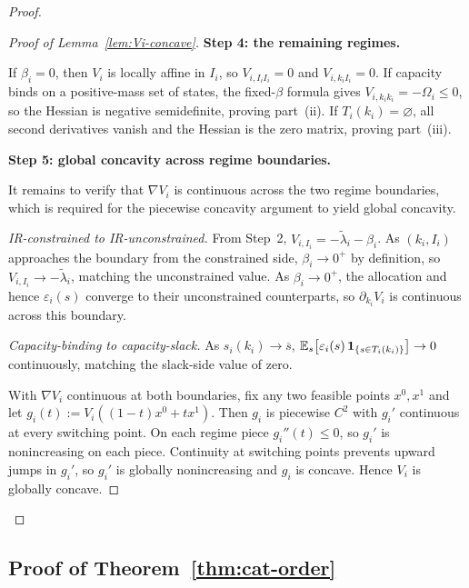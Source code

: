 \documentclass[master.tex]{subfiles}
\begin{document}
\begin{proof}
\begin{proof}[Proof of Lemma~\ref{lem:Vi-concave}]
\noindent\textbf{Step 4: the remaining regimes.}

If $\beta_i=0$, then $V_i$ is locally affine in $I_i$, so $V_{i,I_iI_i}=0$ and $V_{i,k_iI_i}=0$. If capacity binds on a positive-mass set of states, the fixed-$\beta$ formula gives $V_{i,k_ik_i}=-\Omega_i\le 0$, so the Hessian is negative semidefinite, proving part~(ii). If $T_i(k_i)=\varnothing$, all second derivatives vanish and the Hessian is the zero matrix, proving part~(iii).


\noindent\textbf{Step 5: global concavity across regime boundaries.}

It remains to verify that $\nabla V_i$ is continuous across the two regime boundaries, which is required for the piecewise concavity argument to yield global concavity.

\textit{IR-constrained to IR-unconstrained.} From Step~2, $V_{i,I_i}=-\tilde\lambda_i-\beta_i$. As $(k_i,I_i)$ approaches the boundary from the constrained side, $\beta_i\to 0^+$ by definition, so $V_{i,I_i}\to -\tilde\lambda_i$, matching the unconstrained value. As $\beta_i\to 0^+$, the allocation and hence $\varepsilon_i(s)$ converge to their unconstrained counterparts, so $\partial_{k_i}V_i$ is continuous across this boundary.

\textit{Capacity-binding to capacity-slack.} As $s_i(k_i)\to\overline s$, $\mathbb{E}_s\!\left[\varepsilon_i(s)\,\mathbf{1}_{\{s\in T_i(k_i)\}}\right]\to 0$ continuously, matching the slack-side value of zero.

With $\nabla V_i$ continuous at both boundaries, fix any two feasible points $x^0,x^1$ and let $g_i(t):=V_i((1-t)x^0+tx^1)$. Then $g_i$ is piecewise $C^2$ with $g_i'$ continuous at every switching point. On each regime piece $g_i''(t)\le 0$, so $g_i'$ is nonincreasing on each piece. Continuity at switching points prevents upward jumps in $g_i'$, so $g_i'$ is globally nonincreasing and $g_i$ is concave. Hence $V_i$ is globally concave.
\end{proof}
\end{proof}



\subsection{Proof of Theorem~\ref{thm:cat-order}}
\end{document}
